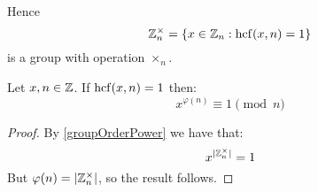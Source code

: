 \documentclass[../main.tex]{subfiles}
\begin{document}
Hence
\[
  \mathbb{Z}^{\times}_{n} = \{x \in \mathbb{Z}_n : \operatorname{hcf}(x, n) = 1\}
\]
is a group with operation $\times_n$.

\begin{theorem}
  Let $x, n \in \mathbb{Z}$.
  If $\operatorname{hcf}(x, n) = 1$ then:
  \[
    x^{\varphi(n)} \equiv 1 \pmod{n}
  \]
\end{theorem}
\begin{proof}
  By \cref{groupOrderPower} we have that:
  \[
    x^{|\mathbb{Z}^{\times}_{n}|} = 1
  \]
  But $\varphi(n) = |\mathbb{Z}^{\times}_{n}|$, so the result follows.
\end{proof}
\end{document}

